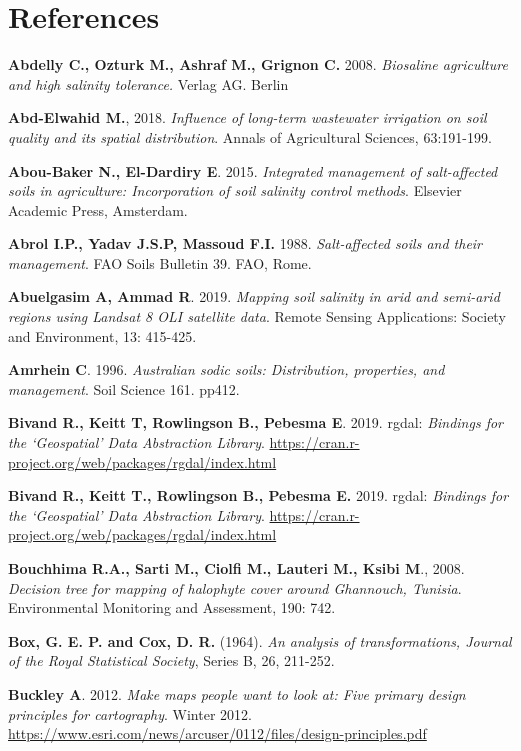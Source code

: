 \documentclass[
  10pt,
  b5paper,
]{book}
\begin{document}
\hypertarget{references}{%
\chapter*{References}\label{references}}

\textbf{Abdelly C., Ozturk M., Ashraf M., Grignon C.} 2008. \emph{Biosaline agriculture and high salinity tolerance.} Verlag AG. Berlin

\textbf{Abd-Elwahid M.}, 2018. \emph{Influence of long-term wastewater irrigation on soil quality and its spatial distribution}. Annals of Agricultural Sciences, 63:191-199.

\textbf{Abou-Baker N., El-Dardiry E}. 2015. \emph{Integrated management of salt-affected soils in agriculture: Incorporation of soil salinity control methods}. Elsevier Academic Press, Amsterdam.

\textbf{Abrol I.P., Yadav J.S.P, Massoud F.I.} 1988. \emph{Salt-affected soils and their management}. FAO Soils Bulletin 39. FAO, Rome.

\textbf{Abuelgasim A, Ammad R}. 2019. \emph{Mapping soil salinity in arid and semi-arid regions using Landsat 8 OLI satellite data}. Remote Sensing Applications: Society and Environment, 13: 415-425.

\textbf{Amrhein C}. 1996. \emph{Australian sodic soils: Distribution, properties, and management}. Soil Science 161. pp412.

\textbf{Bivand R., Keitt T, Rowlingson B., Pebesma E}. 2019. rgdal: \emph{Bindings for the `Geospatial' Data Abstraction Library}. \url{https://cran.r-project.org/web/packages/rgdal/index.html}

\textbf{Bivand R., Keitt T., Rowlingson B., Pebesma E.} 2019. rgdal: \emph{Bindings for the `Geospatial' Data Abstraction Library}. \url{https://cran.r-project.org/web/packages/rgdal/index.html}

\textbf{Bouchhima R.A., Sarti M., Ciolfi M., Lauteri M., Ksibi M}., 2008. \emph{Decision tree for mapping of halophyte cover around Ghannouch, Tunisia}. Environmental Monitoring and Assessment, 190: 742.

\textbf{Box, G. E. P. and Cox, D. R.} (1964). \emph{An analysis of transformations, Journal of the Royal Statistical Society}, Series B, 26, 211-252.

\textbf{Buckley A}. 2012. \emph{Make maps people want to look at: Five primary design principles for cartography}. Winter 2012. \url{https://www.esri.com/news/arcuser/0112/files/design-principles.pdf}
\end{document}

